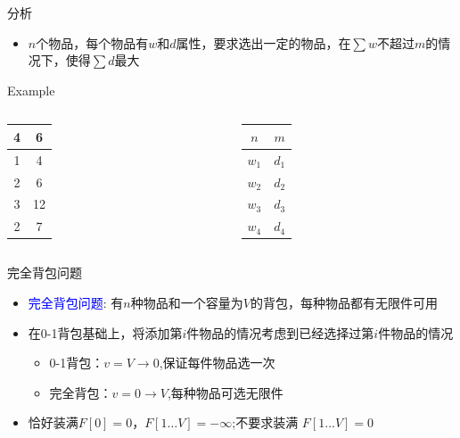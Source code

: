 \begin{frame}{分析}
    \begin{itemize}
        \item $n$个物品，每个物品有$w$和$d$属性，要求选出一定的物品，在$\sum w$不超过$m$的情况下，使得$\sum d$最大
    \end{itemize}
    \vfill
    \begin{exampleblock}{Example}
        \begin{columns}
            \begin{table}
                \begin{tabular}{cc}
                4 & 6 \\\hline
                \alert{1} & \alert{4} \\\hline
                2 & 6 \\\hline
                \alert{3} & \alert{12} \\\hline
                \alert{2} & \alert{7} \\\hline
                \end{tabular}
            \end{table}
            \begin{table}
                \begin{tabular}{cc}
                $n$ & $m$ \\\hline
                $w_1$ & $d_1$ \\\hline
                $w_2$ & $d_2$ \\\hline
                $w_3$ & $d_3$ \\\hline
                $w_4$ & $d_4$ \\\hline
                \end{tabular}
            \end{table}
        \end{columns}
    \end{exampleblock}
\end{frame}    
\begin{frame}{完全背包问题}
    \begin{itemize}
        \item \textcolor{blue}{完全背包问题}: 有$n$种物品和一个容量为$V$的背包，每种物品都有无限件可用
        \vfill
        \item 在0-1背包基础上，将添加第$i$件物品的情况考虑到已经选择过第$i$件物品的情况
        \begin{itemize}                
            \item 0-1背包：$v=V\rightarrow 0$,保证每件物品选一次
            \item 完全背包：$v=0\rightarrow V$,每种物品可选无限件
        \end{itemize}
        \vfill
        \item 恰好装满$F[0]=0$，$F[1\ldots V]=-\infty$;不要求装满 $F[1\ldots V]=0$
    \end{itemize}
\end{frame}       
